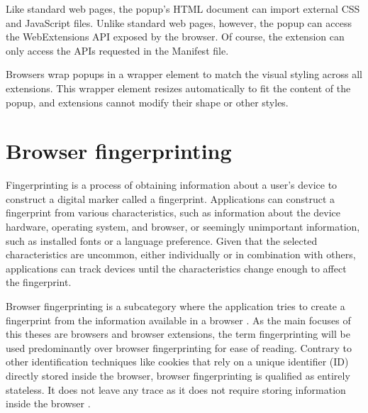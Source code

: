 Like standard web pages, the popup's HTML document can import external CSS and JavaScript files. Unlike standard web pages, however, the popup can access the WebExtensions API exposed by the browser. Of course, the extension can only access the APIs requested in the Manifest file.

Browsers wrap popups in a wrapper element to match the visual styling across all extensions. This wrapper element resizes automatically to fit the content of the popup, and extensions cannot modify their shape or other styles.




\chapter{Browser fingerprinting}
\label{Chapter:BrowserFingerprinting}

Fingerprinting is a process of obtaining information about a user's device to construct a digital marker called a fingerprint. Applications can construct a fingerprint from various characteristics, such as information about the device hardware, operating system, and browser, or seemingly unimportant information, such as installed fonts or a language preference. Given that the selected characteristics are uncommon, either individually or in combination with others, applications can track devices until the characteristics change enough to affect the fingerprint.

Browser fingerprinting is a subcategory where the application tries to create a fingerprint from the information available in a browser \cite{FingerprintingSurvey}. As the main focuses of this theses are browsers and browser extensions, the term fingerprinting will be used predominantly over browser fingerprinting for ease of reading. Contrary to other identification techniques like cookies that rely on a unique identifier (ID) directly stored inside the browser, browser fingerprinting is qualified as entirely stateless. It does not leave any trace as it does not require storing information inside the browser \cite{FingerprintingSurvey}.

